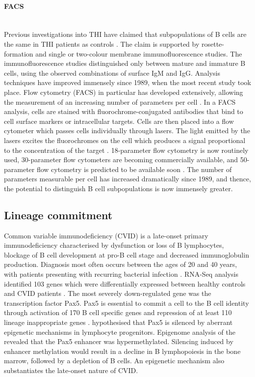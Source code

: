 \documentclass[12pt]{article}
\begin{document}
			
			
		\paragraph{FACS}
			~\\
			Previous investigations into THI have claimed that subpopulations of B cells are the same in THI patients as controls \citep{Tiller78,Stiemh80,Siegel81,Buckley83,Fiorilli86,Dressler89}. 
			The claim is supported by rosette-formation and single or two-colour membrane immunofluorescence studies. 
			The immunofluorescence studies distinguished only between mature and immature B cells, using the observed combinations of surface IgM and IgG. 
			Analysis techniques have improved immensely since 1989, when the most recent study took place.
			Flow cytometry (FACS) in particular has developed extensively, allowing the measurement of an increasing number of parameters per cell \citep{Saeys16}.
			In a FACS analysis, cells are stained with fluorochrome-conjugated antibodies that bind to cell surface markers or intracellular targets. 
			Cells are then placed into a flow cytometer which passes cells individually through lasers.
			The light emitted by the lasers excites the fluorochromes on the cell which produces a signal proportional to the concentration of the target \citep{Aghaeepour13}.
			18-parameter flow cytometry is now routinely used, 30-parameter flow cytometers are becoming commercially available, and 50-parameter flow cytometry is predicted to be available soon \citep{Saeys16}.
			The number of parameters measurable per cell has increased dramatically since 1989, and thence, the potential to distinguish B cell subpopulations is now immensely greater.

			
		\subsection{Lineage commitment}
			Common variable immunodeficiency (CVID) is a late-onset primary immunodeficiency characterised by dysfunction or loss of B lymphocytes, blockage of B cell development at pro-B cell stage and decreased immunoglobulin production. 
			Diagnosis most often occurs between the ages of 20 and 40 years, with patients presenting with recurring bacterial infection \citep{Cunningham-Rundles12}.
			RNA-Seq analysis identified 103 genes which were differentially expressed between healthy controls and CVID patients \citep{Tallmadge15}.
			The most severely down-regulated gene was the transcription factor Pax5.
			Pax5 is essential to commit a cell to the B cell identity through activation of 170 B cell specific genes and repression of at least 110 lineage inappropriate genes \citep{Schebesta07,Delogu06,Roessler07}.
			\citet{Tallmadge15} hypothesised that Pax5 is silenced by aberrant epigenetic mechanisms in lymphocyte progenitors. 
			Epigenome analysis of the revealed that the Pax5 enhancer was hypermethylated.
			Silencing induced by enhancer methylation would result in a decline in B lymphopoiesis in the bone marrow, followed by a depletion of B cells.
			An epigenetic mechanism also substantiates the late-onset nature of CVID. 
			
\end{document}
